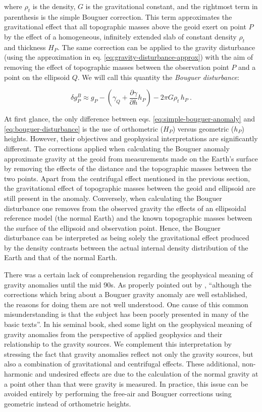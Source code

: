 \documentclass[extra]{gji}
\begin{document}
\noindent
where $\rho_t$ is the density, $G$ is the gravitational constant,
and the rightmost term in parenthesis is the simple Bouguer correction.
This term approximates the gravitational effect that all topographic
masses above the geoid exert on point $P$ by the effect of a homogeneous,
infinitely extended slab of constant density $\rho_{t}$ and thickness $H_{P}$.
The same correction can be applied to the gravity disturbance
(using the approximation in eq. \ref{eq:gravity-disturbance-approx})
with the aim of removing the effect of topographic masses between
the observation point $P$ and a point on the ellipsoid $Q$.
We will call this quantity the \textit{Bouguer disturbance}:

\begin{equation}
\delta g_P^{B} \approx
g_{P} -
\left( \gamma_{Q} + \frac{\partial \gamma}{\partial h} h_P \right)
- 2 \pi G \rho_{t} \, h_{P} \: .
\label{eq:bouguer-disturbance}
\end{equation}

At first glance, the only difference between eqs.
\ref{eq:simple-bouguer-anomaly} and \ref{eq:bouguer-disturbance} is the use of
orthometric ($H_P$) versus geometric ($h_P$) heights.
However, their objectives and geophysical interpretations are significantly
different.
The corrections applied when calculating the Bouguer anomaly approximate
gravity at the geoid from measurements made on the Earth's surface by removing
the effects of the distance and the topographic masses between the two points.
Apart from the centrifugal effect mentioned in the previous section,
the gravitational effect of topographic masses between the geoid and ellipsoid
are still present in the anomaly.
Conversely, when calculating the Bouguer disturbance one removes from
the observed gravity the effects of an ellipsoidal reference model (the normal
Earth) and the known topographic masses between the surface of the ellipsoid
and observation point.
Hence, the Bouguer disturbance can be interpreted as being solely the
gravitational effect produced by the density contrasts between the actual
internal density distribution of the Earth and that of the normal Earth.

There was a certain lack of comprehension regarding the geophysical meaning of
gravity anomalies until the mid 90s.
As properly pointed out by \citet{chapin1996},
``although the corrections which bring about a Bouguer gravity anomaly are well
established, the reasons for doing them are not well understood. One cause of
this common misunderstanding is that the subject has been poorly presented in
many of the basic texts''.
In his seminal book, \citet{blakely1996} shed some light on the geophysical
meaning of gravity anomalies from the perspective of applied geophysics and
their relationship to the gravity sources.
We complement this interpretation by stressing the fact that
gravity anomalies reflect not only the gravity sources,
but also a combination of gravitational and centrifugal effects.
These additional, non-harmonic and undesired effects are due to the calculation
of the normal gravity at a point other than that were gravity is measured.
In practice, this issue can be avoided entirely by performing the free-air and
Bouguer corrections using geometric instead of orthometric heights.
\end{document}
